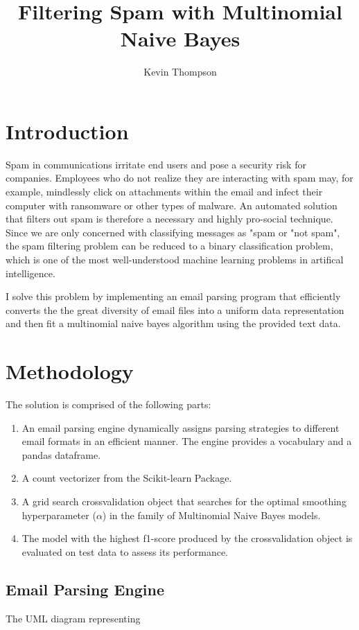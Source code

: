 \documentclass[10pt,a4paper]{article}
\author{Kevin Thompson}
\title{Filtering Spam with Multinomial Naive Bayes}
\begin{document}
\maketitle



\section{Introduction}
Spam in communications irritate end users and pose a security risk for companies. Employees who do not realize they are interacting with spam may, for example, mindlessly click on attachments within the email and infect their computer with ransomware or other types of malware. An automated solution that filters out spam is therefore a necessary and highly pro-social technique. Since we are only concerned with classifying messages as "spam or "not spam", the spam filtering problem can be reduced to a binary classification problem, which is one of the most well-understood machine learning problems in artifical intelligence.

I solve this problem by implementing an email parsing program that efficiently converts the the great diversity of email files into a uniform data representation and then fit a multinomial naive bayes algorithm using the provided text data.

\section{Methodology}
The solution is comprised of the following parts:
\begin{enumerate}
\item An email parsing engine dynamically assigns parsing strategies to different email formats in an efficient manner. The engine provides a vocabulary and a pandas dataframe.
\item A count vectorizer from the Scikit-learn Package.
\item A grid search crossvalidation object that searches for the optimal smoothing hyperparameter ($\alpha$) in the family of Multinomial Naive Bayes models.
\item The model with the highest f1-score produced by the crossvalidation object is evaluated on test data to assess its performance.
\end{enumerate}

\subsection{Email Parsing Engine}
The UML diagram representing 
\end{document}
